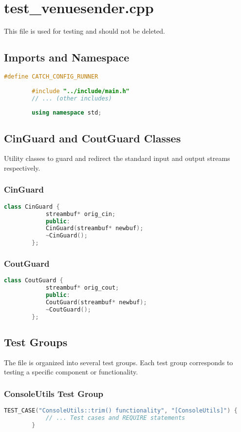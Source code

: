 \documentclass{article}
\begin{document}
	\section{test\_venuesender.cpp}
	
	This file is used for testing and should not be deleted.
	
	\subsection*{Imports and Namespace}
	\begin{lstlisting}[language=C++]
		#define CATCH_CONFIG_RUNNER
		
		#include "../include/main.h"
		// ... (other includes)
		
		using namespace std;
	\end{lstlisting}
	
	\subsection*{CinGuard and CoutGuard Classes}
	Utility classes to guard and redirect the standard input and output streams respectively.
	
	\subsubsection*{CinGuard}
	\begin{lstlisting}[language=C++]
		class CinGuard {
			streambuf* orig_cin;
			public:
			CinGuard(streambuf* newbuf);
			~CinGuard();
		};
	\end{lstlisting}
	
	\subsubsection*{CoutGuard}
	\begin{lstlisting}[language=C++]
		class CoutGuard {
			streambuf* orig_cout;
			public:
			CoutGuard(streambuf* newbuf);
			~CoutGuard();
		};
	\end{lstlisting}
	
	\subsection*{Test Groups}
	The file is organized into several test groups. Each test group corresponds to testing a specific component or functionality.
	
	\subsubsection*{ConsoleUtils Test Group}
	\begin{lstlisting}[language=C++]
		TEST_CASE("ConsoleUtils::trim() functionality", "[ConsoleUtils]") {
			// ... Test cases and REQUIRE statements
		}
	\end{lstlisting}
	
\end{document}

